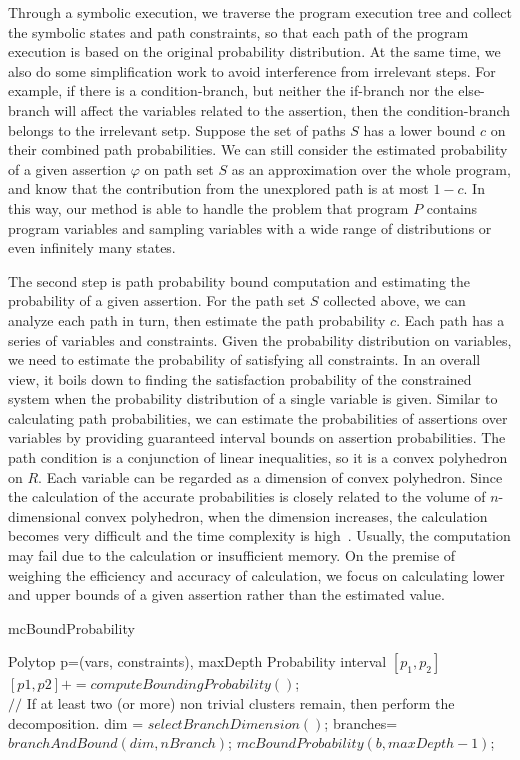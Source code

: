 \documentclass[conference]{IEEEtran}
\begin{document}
Through a symbolic execution, we traverse the program execution tree and collect the symbolic states and path constraints, so that each path of the program execution is based on the original probability distribution. At the same time, we also do some simplification work to avoid interference from irrelevant steps. For example, if there is a condition-branch, but neither the if-branch nor the else-branch will affect the variables related to the assertion, then the condition-branch belongs to the irrelevant setp.
Suppose the set of paths $S$ has a lower bound $c$ on their combined path probabilities. We can still consider the estimated probability of a given assertion $\varphi$ on path set $S$ as an approximation over the whole program, and know that the contribution from the unexplored path is at most $1-c$. In this way, our method is able to handle the problem that program $P$ contains program variables and sampling variables with a wide range of distributions or even infinitely many states. 

The second step is path probability bound computation and estimating the probability of a given assertion. 
For the path set $S$ collected above, we can analyze each path in turn, then estimate the path probability $c$. Each path has a series of variables and constraints. Given the probability distribution on variables, we need to estimate the probability of satisfying all constraints. In an overall view, it boils down to finding the satisfaction probability of the constrained system when the probability distribution of a single variable is given. Similar to calculating path probabilities, we can estimate the probabilities of assertions over variables by providing guaranteed interval bounds on assertion probabilities. The path condition is a conjunction of linear inequalities, so it is a convex polyhedron on $R$. Each variable can be regarded as a dimension of convex polyhedron.
Since the calculation of the accurate probabilities is closely related to the volume of $n$-dimensional convex polyhedron, when the dimension increases, the calculation becomes very difficult and the time complexity is high~\cite{Arora1998Proof}. Usually, the computation may fail due to the calculation or insufficient memory. 
On the premise of weighing the efficiency and accuracy of calculation, we focus on calculating lower and upper bounds of a given assertion rather than the estimated value. 

\begin{algorithm}	
	\caption{mcBoundProbability}	
	\label{mcBoundProbability}	
	\begin{algorithmic}[1]	
		\REQUIRE Polytop p=(vars, constraints), maxDepth		
		\ENSURE Probability interval $[p_1, p_2]$		
		\STATE $[p1,p2]+=computeBoundingProbability()$;	
		\ENDIF  \\		
		$//$ If at least two (or more) non trivial clusters remain, then perform the decomposition.  		
		\STATE dim = $selectBranchDimension()$;		
		\STATE branches= $branchAndBound(dim, nBranch)$;		
		\STATE $mcBoundProbability(b, maxDepth-1)$;		
		\ENDFOR
		\ENDIF
	\end{algorithmic}
\end{algorithm}
\end{document}
